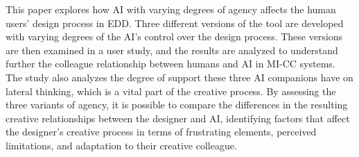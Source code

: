 
This paper explores how AI with varying degrees of agency affects the human users' design process in EDD. Three different versions of the tool are developed with varying degrees of the AI's control over the design process. These versions are then examined in a user study, and the results are analyzed to understand further the colleague relationship between humans and AI in MI-CC systems. The study also analyzes the degree of support these three AI companions have on lateral thinking, which is a vital part of the creative process. By assessing the three variants of agency, it is possible to compare the differences in the resulting creative relationships between the designer and AI, identifying factors that affect the designer's creative process in terms of frustrating elements, perceived limitations, and adaptation to their creative colleague.



    
    
    
    






    
    
    
    



